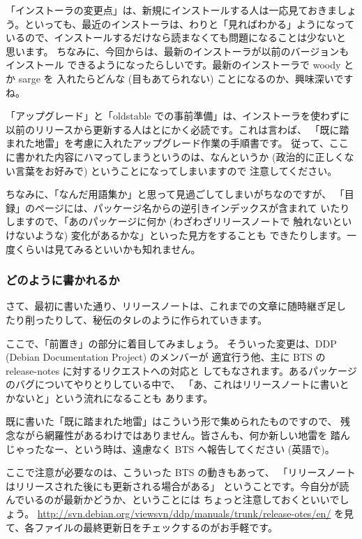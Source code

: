 \documentclass[mingoth,a4paper]{jsarticle}
\begin{document}
「インストーラの変更点」は、新規にインストールする人は一応見ておきましょ
う。といっても、最近のインストーラは、わりと「見ればわかる」ようになって
いるので、インストールするだけなら読まなくても問題になることは少ないと
思います。
ちなみに、今回からは、最新のインストーラが以前のバージョンもインストール
できるようになったらしいです。最新のインストーラで woody とか sarge を
入れたらどんな (目もあてられない) ことになるのか、興味深いですね。

「アップグレード」と「oldstable での事前準備」は、インストーラを使わずに
以前のリリースから更新する人はとにかく必読です。これは言わば、
「既に踏まれた地雷」を考慮に入れたアップグレード作業の手順書です。
従って、ここに書かれた内容にハマってしまうというのは、なんというか
(政治的に正しくない言葉をお好みで) ということになってしまいますので
注意してください。

ちなみに、「なんだ用語集か」と思って見過ごしてしまいがちなのですが、
「目録」のページには、パッケージ名からの逆引きインデックスが含まれて
いたりしますので、「あのパッケージに何か (わざわざリリースノートで
触れないといけないような) 変化があるかな」といった見方をすることも
できたりします。一度くらいは見てみるといいかも知れません。

\subsubsection{どのように書かれるか}
さて、最初に書いた通り、リリースノートは、これまでの文章に随時継ぎ足し
たり削ったりして、秘伝のタレのように作られていきます。

ここで、「前置き」の部分に着目してみましょう。
そういった変更は、DDP (Debian Documentation Project) のメンバーが
適宜行う他、主に BTS の release-notes に対するリクエストへの対応と
してもなされます。あるパッケージのバグについてやりとりしている中で、
「あ、これはリリースノートに書いとかないと」という流れになることも
あります。

既に書いた「既に踏まれた地雷」はこういう形で集められたものですので、
残念ながら網羅性があるわけではありません。皆さんも、何か新しい地雷を
踏んじゃったなー、という時は、遠慮なく BTS へ報告してください (英語で)。

ここで注意が必要なのは、こういった BTS の動きもあって、
「リリースノートはリリースされた後にも更新される場合がある」
ということです。今自分が読んでいるのが最新かどうか、ということには
ちょっと注意しておくといいでしょう。
\url{http://svn.debian.org/viewsvn/ddp/manuals/trunk/release-otes/en/}
を見て、各ファイルの最終更新日をチェックするのがお手軽です。
\end{document}
